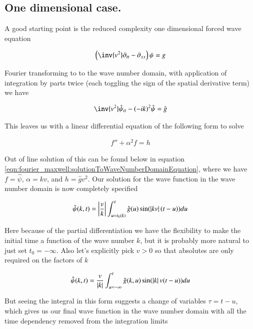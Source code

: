 \subsection{One dimensional case. }

A good starting point is the reduced complexity one dimensional forced
wave equation

\begin{align}
\left( \inv{v^2} \partial_{tt} -\partial_{xx} \right)\psi = g
\end{align}

Fourier transforming to to the wave number domain, with application of integration by parts twice (each toggling the sign of the spatial
derivative term) we have

\begin{align}
\inv{v^2}\hat{\psi}_{tt} - (-i k)^2 \hat{\psi} = \hat{g}
\end{align}

This leaves us with a linear differential equation of the following form to solve

\begin{align}\label{eqn:fourier_maxwell:waveNumEquationToSolve}
f'' + \alpha^2 f = h
\end{align}

Out of line solution of this can be found below in equation \ref{eqn:fourier_maxwell:solutionToWaveNumberDomainEquation}, where we have
$f = \hat{\psi}$, $\alpha = k v$, and $h = \hat{g} v^2$.  Our solution for the wave function in the wave number domain is now completely
specified

\begin{align*}
\hat{\psi}(k, t) = \left\lvert{\frac{v}{k}}\right\rvert \int_{u=t_0(k)}^t \hat{g}(u) \sin( \left\lvert{k v}\right\rvert (t-u) ) du
\end{align*}

Here because of the partial differentiation we have the flexibility to make the initial time a function of the wave number $k$, but it is probably more natural to just set $t_0 = -\infty$.  Also let's explicitly pick $v > 0$ so that absolutes are only required on the factors of $k$

\begin{align*}
\hat{\psi}(k, t) = \frac{v}{\left\lvert{k}\right\rvert} \int_{u = -\infty}^t \hat{g}(k, u) \sin( \left\lvert{k}\right\rvert v (t-u) ) du
\end{align*}

But seeing the integral in this form suggests a change of variables $\tau = t-u$, which gives us our final wave function in the wave number domain with all the time
dependency removed from the integration limits

